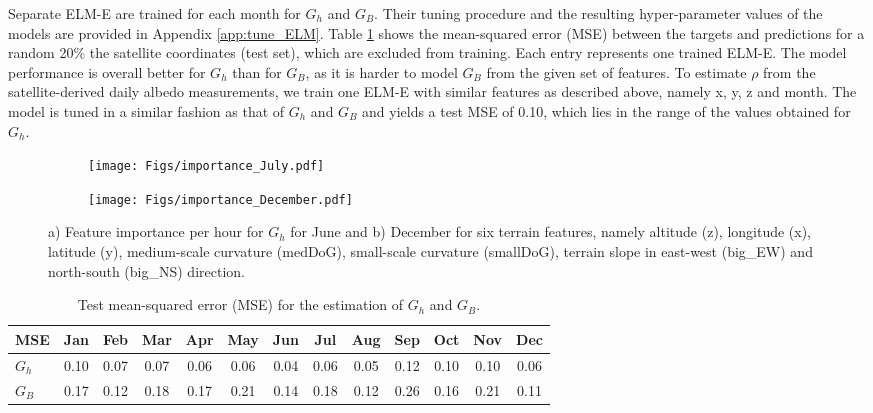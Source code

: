 Separate ELM-E are trained for each month for $G_h$ and $G_B$. Their tuning procedure and the resulting hyper-parameter values of the models are provided in Appendix \ref{app:tune_ELM}. 
Table \ref{tab:G_train} shows the mean-squared error (MSE) between the targets and predictions for a random 20\% the satellite coordinates (test set), which are excluded from training. Each entry represents one trained ELM-E.
The model performance is overall better for $G_h$ than for $G_B$, as it is harder to model $G_B$ from the given set of features.
%
To estimate $\rho$ from the satellite-derived daily albedo measurements, we train one ELM-E with similar features as described above, namely x, y, z and month. The model is tuned in a similar fashion as that of $G_h$ and $G_B$ and yields a test MSE of 0.10, which lies in the range of the values obtained for $G_h$.

\begin{figure}[tb]
\centering
\begin{subfigure}{.4\textwidth}
  \centering
  \texttt{[image: Figs/importance\_July.pdf]}  
\end{subfigure}
\begin{subfigure}{.4\textwidth}
  \centering
  \texttt{[image: Figs/importance\_December.pdf]}  
\end{subfigure}
\caption{a) Feature importance per hour for $G_h$ for June and b) December for six terrain features, namely altitude (z), longitude (x), latitude (y), medium-scale curvature (medDoG), small-scale curvature (smallDoG), terrain slope in east-west (big\_EW) and north-south (big\_NS) direction.}
\label{fig:ftrs_phys}
\end{figure}

\begin{table}[tb]
\centering
\footnotesize
\begin{tabular}{lcccccccccccc}
\hline 
 \textbf{MSE}   & Jan  & Feb  & Mar   & Apr   & May   & Jun   & Jul   & Aug   & Sep   & Oct  & Nov  & Dec  \\
\hline 
$G_h$  & 0.10 & 0.07 & 0.07  & 0.06  & 0.06  & 0.04  & 0.06  & 0.05  & 0.12  & 0.10 & 0.10 & 0.06 \\
$G_B$  & 0.17 & 0.12 & 0.18 & 0.17 & 0.21 & 0.14  & 0.18  & 0.12 & 0.26 & 0.16 & 0.21 & 0.11 \\
\hline 
\end{tabular}
\caption{Test mean-squared error (MSE) for the estimation of $G_h$ and $G_B$.}
\label{tab:G_train}
\end{table}

